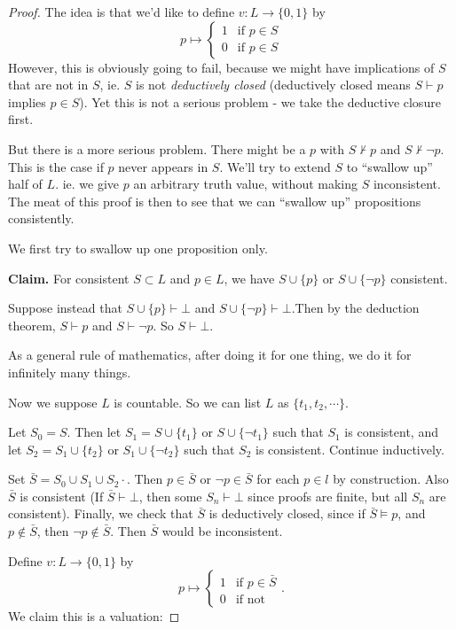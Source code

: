 \documentclass[a4paper]{article}
\begin{document}
\begin{proof}
  The idea is that we'd like to define $v: L \to \{0, 1\}$ by
  \[
    p\mapsto
    \begin{cases}
      1 & \text{if } p\in S\\
      0 & \text{if } p\in S
    \end{cases}
  \]
  However, this is obviously going to fail, because we might have implications of $S$ that are not in $S$, ie. $S$ is not \emph{deductively closed} (deductively closed means $S\vdash p$ implies $p\in S$). Yet this is not a serious problem - we take the deductive closure first.

  But there is a more serious problem. There might be a $p$ with $S\not\vdash p$ and $S\not\vdash \neg p$. This is the case if $p$ never appears in $S$. We'll try to extend $S$ to ``swallow up'' half of $L$. ie. we give $p$ an arbitrary truth value, without making $S$ inconsistent. The meat of this proof is then to see that we can ``swallow up'' propositions consistently.

  We first try to swallow up one proposition only.
  
  \noindent\textbf{Claim.} For consistent $S\subset L$ and $p\in L$, we have $S\cup \{p\}$ or $S\cup \{\neg p\}$ consistent.

  Suppose instead that $S\cup \{p\} \vdash \bot$ and $S\cup \{\neg p\}\vdash \bot$.Then by the deduction theorem, $S\vdash p$ and $S\vdash \neg p$. So $S\vdash \bot$.

  As a general rule of mathematics, after doing it for one thing, we do it for infinitely many things.

  Now we suppose $L$ is countable. So we can list $L$ as $\{t_1, t_2, \cdots\}$.

  Let $S_0 = S$. Then let $S_1 = S\cup \{t_1\}$ or $S\cup \{\neg t_1\}$ such that $S_1$ is consistent, and let $S_2 = S_1 \cup \{t_2\}$ or $S_1\cup \{\neg t_2\}$ such that $S_2$ is consistent. Continue inductively.

  Set $\bar{S} = S_0\cup S_1\cup S_2\cdot$. Then $p\in \bar{S}$ or $\neg p\in \bar{S}$ for each $p\in l$ by construction. Also $\bar S$ is consistent (If $\bar S\vdash \bot$, then some $S_n\vdash \bot$ since proofs are finite, but all $S_n$ are consistent). Finally, we check that $\bar S$ is deductively closed, since if $\bar S\models p$, and $p\not\in \bar S$, then $\neg p\not\in \bar S$. Then $\bar S$ would be inconsistent.

  Define $v: L\to \{0, 1\}$ by
  \[
    p \mapsto
    \begin{cases}
      1 & \text{if }p\in \bar S\\
      0 & \text{if not}
    \end{cases}.
  \]
  We claim this is a valuation:


\end{proof}
\end{document}
